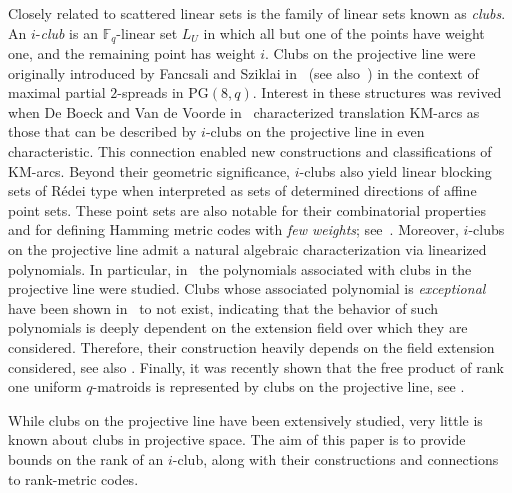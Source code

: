 \documentclass[11pt]{amsart}
\theoremstyle{definition}
\newcommand{\fq}{{\mathbb F}_{q}}
\newcommand{\PG}{\mathrm{PG}}
\begin{document}
Closely related to scattered linear sets is the family of linear sets known as \emph{clubs}. An $i$-\emph{club} is an $\fq$-linear set $L_U$ in which all but one of the points have weight one, and the remaining point has weight $i$. 
Clubs on the projective line were originally introduced by Fancsali and Sziklai in~\cite{fancsali2006maximal} (see also~\cite{fancsali2009description}) in the context of maximal partial $2$-spreads in $\PG(8, q)$. Interest in these structures was revived when De Boeck and Van de Voorde in~\cite{de2016linear} characterized translation KM-arcs as those that can be described by $i$-clubs on the projective line in even characteristic. This connection enabled new constructions and classifications of KM-arcs.
Beyond their geometric significance, $i$-clubs also yield linear blocking sets of R\'edei type when interpreted as sets of determined directions of affine point sets. These point sets are also notable for their combinatorial properties and for defining Hamming metric codes with \emph{few weights}; see~\cite{napolitano2023two}.
Moreover, $i$-clubs on the projective line admit a natural algebraic characterization via linearized polynomials. In particular, in~\cite{bartoli2022r} the polynomials associated with clubs in the projective line were studied. Clubs whose associated polynomial is \emph{exceptional} have been shown in~\cite{bartoli2022r} to not exist, indicating that the behavior of such polynomials is deeply dependent on the extension field over which they are considered.
Therefore, their construction heavily depends on the field extension considered, see also \cite{polverino2024fat}. 
Finally, it was recently shown that the free product of rank one uniform $q$-matroids is represented by clubs on the projective line, see \cite{alfarano2024free}.

While clubs on the projective line have been extensively studied, very little is known about clubs in projective space. The aim of this paper is to provide bounds on the rank of an $i$-club, along with their constructions and connections to rank-metric codes.
\end{document}
